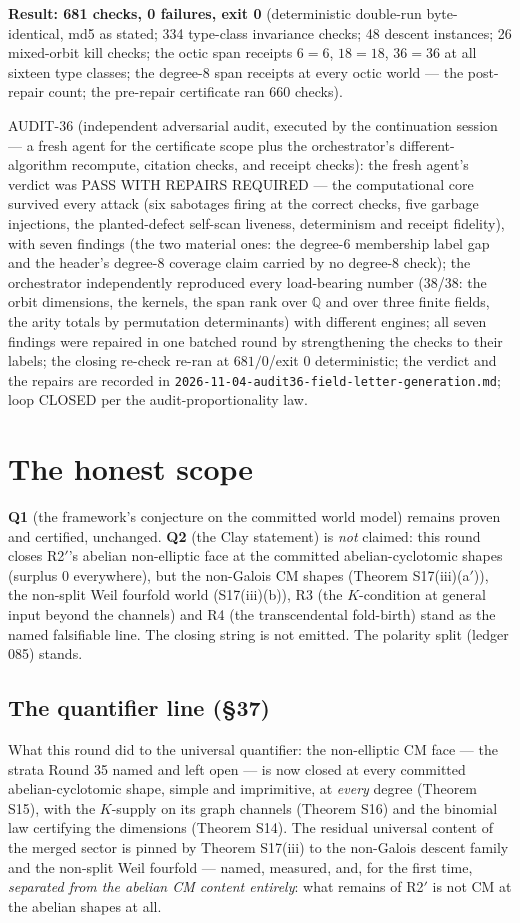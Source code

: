 \documentclass[11pt]{article}
\newcommand{\Q}{\mathbb{Q}}
\begin{document}
\textbf{Result: 681 checks, 0 failures, exit 0} (deterministic double-run
byte-identical, md5 as stated; 334 type-class invariance checks; 48 descent
instances; 26 mixed-orbit kill checks; the octic span receipts $6{=}6$, $18{=}18$,
$36{=}36$ at all sixteen type classes; the degree-8 span receipts at every
octic world — the post-repair count; the pre-repair certificate ran 660
checks).

AUDIT-36 (independent adversarial audit, executed by the continuation session
--- a fresh agent for the certificate scope plus the orchestrator's
different-algorithm recompute, citation checks, and receipt checks): the fresh
agent's verdict was PASS WITH REPAIRS REQUIRED --- the computational core
survived every attack (six sabotages firing at the correct checks, five
garbage injections, the planted-defect self-scan liveness, determinism and
receipt fidelity), with seven findings (the two material ones: the degree-6
membership label gap and the header's degree-8 coverage claim carried by no
degree-8 check); the orchestrator independently reproduced every
load-bearing number (38/38: the orbit dimensions, the kernels, the span rank
over $\Q$ and over three finite fields, the arity totals by permutation
determinants) with different engines; all seven findings were repaired in one
batched round by strengthening the checks to their labels; the closing
re-check re-ran at $681/0$/exit 0 deterministic; the verdict and the repairs
are recorded in \texttt{2026-11-04-audit36-field-letter-generation.md};
loop CLOSED per the audit-proportionality law.

\section{The honest scope}

\textbf{Q1} (the framework's conjecture on the committed world model) remains
proven and certified, unchanged. \textbf{Q2} (the Clay statement) is \emph{not}
claimed: this round closes R2$'$'s abelian non-elliptic face at the committed
abelian-cyclotomic shapes (surplus $0$ everywhere), but the non-Galois CM shapes
(Theorem S17(iii)(a$'$)), the non-split Weil fourfold world (S17(iii)(b)), R3
(the $K$-condition at general input beyond the channels) and R4 (the
transcendental fold-birth) stand as the named falsifiable line. The closing
string is not emitted. The polarity split (ledger 085) stands.

\subsection*{The quantifier line (\S37)}
What this round did to the universal quantifier: the non-elliptic CM face ---
the strata Round 35 named and left open --- is now closed at every committed
abelian-cyclotomic shape, simple and imprimitive, at \emph{every} degree
(Theorem S15), with the $K$-supply on its graph channels (Theorem S16) and the
binomial law certifying the dimensions (Theorem S14). The residual universal
content of the merged sector is pinned by Theorem S17(iii) to the non-Galois
descent family and the non-split Weil fourfold --- named, measured, and, for
the first time, \emph{separated from the abelian CM content entirely}: what
remains of R2$'$ is not CM at the abelian shapes at all.
\end{document}
